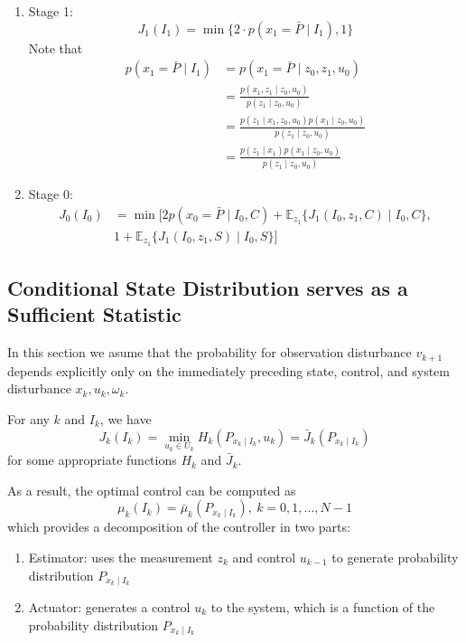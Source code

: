 \begin{enumerate}
\item
Stage 1:
\[
J_1(I_1) = \min\{2\cdot p(x_1=\bar{P}\mid I_1),1\}
\]
Note that
\begin{align*}
p(x_1=\bar{P}\mid I_1)&=p(x_1=\bar{P}\mid z_0,z_1,u_0)\\
&=\frac{p(x_1,z_1\mid z_0,u_0)}{p(z_1\mid z_0,u_0)}\\
&=\frac{p(z_1\mid x_1,z_0,u_0)p(x_1\mid z_0,u_0)}{p(z_1\mid z_0,u_0)}\\
&=\frac{p(z_1\mid x_1)p(x_1\mid z_0,u_0)}{p(z_1\mid z_0,u_0)}
\end{align*}
\item
Stage 0:
\begin{align*}
J_0(I_0)&=\min[
2p(x_0=\bar{P}\mid I_0,C)+\mathbb{E}_{z_1}\{J_1(I_0,z_1,C)\mid I_0,C\},\\
&1+\mathbb{E}_{z_1}\{J_1(I_0,z_1,S)\mid I_0,S\}
]
\end{align*}

\end{enumerate}

\subsection{Conditional State Distribution serves as a Sufficient Statistic}
In this section we asume that the probability for observation disturbance $v_{k+1}$ depends explicitly only on the immediately preceding state, control, and system disturbance $x_k,u_k,\omega_k$.
\begin{theorem}
For any $k$ and $I_k$, we have
\[
J_k(I_k) = \min_{u_k\in U_k}H_k(P_{x_k\mid I_k},u_k)=\bar{J}_k(P_{x_k\mid I_k})
\]
for some appropriate functions $H_k$ and $\bar{J}_k$.
\end{theorem}
\begin{remark}
As a result, the optimal control can be computed as
\[
\mu_k(I_k)=\bar{\mu}_k(P_{x_k\mid I_k}),\ k=0,1,\dots,N-1
\]
which provides a decomposition of the controller in two parts:
\begin{enumerate}
\item
Estimator: uses the measurement $z_k$ and control $u_{k-1}$ to generate probability distribution $P_{x_k\mid I_k}$
\item
Actuator: generates a control $u_k$ to the system, which is a function of the probability distribution $P_{x_k\mid I_k}$
\end{enumerate}
\end{remark}

